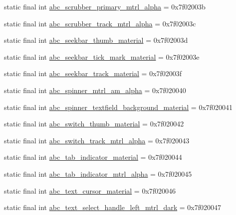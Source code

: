 \begin{CompactItemize}
\item 
static final int \hyperlink{classandroid_1_1support_1_1v4_1_1_r_1_1drawable_0917488d0a3c439fd436437f4cc0ede0}{abc\_\-scrubber\_\-primary\_\-mtrl\_\-alpha} = 0x7f02003b
\item 
static final int \hyperlink{classandroid_1_1support_1_1v4_1_1_r_1_1drawable_febbc743c19ffb62d5fa3408ac083e67}{abc\_\-scrubber\_\-track\_\-mtrl\_\-alpha} = 0x7f02003c
\item 
static final int \hyperlink{classandroid_1_1support_1_1v4_1_1_r_1_1drawable_ad9211c6a05f73381bb22faeb43bcf04}{abc\_\-seekbar\_\-thumb\_\-material} = 0x7f02003d
\item 
static final int \hyperlink{classandroid_1_1support_1_1v4_1_1_r_1_1drawable_cd6b8fb96b3846b7f7f355806136c2bc}{abc\_\-seekbar\_\-tick\_\-mark\_\-material} = 0x7f02003e
\item 
static final int \hyperlink{classandroid_1_1support_1_1v4_1_1_r_1_1drawable_46a53da128f57aa1c45fa2c8e500ae85}{abc\_\-seekbar\_\-track\_\-material} = 0x7f02003f
\item 
static final int \hyperlink{classandroid_1_1support_1_1v4_1_1_r_1_1drawable_dd0b0e6fdc7ec11e464f20ff7b723777}{abc\_\-spinner\_\-mtrl\_\-am\_\-alpha} = 0x7f020040
\item 
static final int \hyperlink{classandroid_1_1support_1_1v4_1_1_r_1_1drawable_aef20818680e76e0dcdb2536ad2c31c7}{abc\_\-spinner\_\-textfield\_\-background\_\-material} = 0x7f020041
\item 
static final int \hyperlink{classandroid_1_1support_1_1v4_1_1_r_1_1drawable_919e9dcf2d23a7e390ce31132ffea481}{abc\_\-switch\_\-thumb\_\-material} = 0x7f020042
\item 
static final int \hyperlink{classandroid_1_1support_1_1v4_1_1_r_1_1drawable_48f3249bacc7377dfabd0d31be46765e}{abc\_\-switch\_\-track\_\-mtrl\_\-alpha} = 0x7f020043
\item 
static final int \hyperlink{classandroid_1_1support_1_1v4_1_1_r_1_1drawable_411eb5fc8b59ed3cc7a0d443fca7f1d7}{abc\_\-tab\_\-indicator\_\-material} = 0x7f020044
\item 
static final int \hyperlink{classandroid_1_1support_1_1v4_1_1_r_1_1drawable_1473a7c4cddebac929f7e1797979df5c}{abc\_\-tab\_\-indicator\_\-mtrl\_\-alpha} = 0x7f020045
\item 
static final int \hyperlink{classandroid_1_1support_1_1v4_1_1_r_1_1drawable_e436c84a0ec798240b22e530f5a5f23a}{abc\_\-text\_\-cursor\_\-material} = 0x7f020046
\item 
static final int \hyperlink{classandroid_1_1support_1_1v4_1_1_r_1_1drawable_21d1d0eff2dfb2dfa474183a8b5be0e2}{abc\_\-text\_\-select\_\-handle\_\-left\_\-mtrl\_\-dark} = 0x7f020047

\end{CompactItemize}
